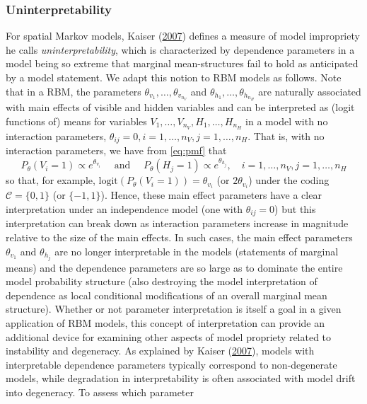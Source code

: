 \documentclass[]{article}
\theoremstyle{definition}
\newcommand{\nv}{{n_{\scriptscriptstyle V}}}
\newcommand{\nh}{{n_{\scriptscriptstyle H}}}
\begin{document}
\hypertarget{uninterpretability}{%
\subsubsection{Uninterpretability}\label{uninterpretability}}

For spatial Markov models, Kaiser
(\protect\hyperlink{ref-kaiser2007statistical}{2007}) defines a measure
of model impropriety he calls \emph{uninterpretability}, which is
characterized by dependence parameters in a model being so extreme that
marginal mean-structures fail to hold as anticipated by a model
statement. We adapt this notion to RBM models as follows. Note that in a
RBM, the parameters \(\theta_{v_1}, \dots, \theta_{v_\nv}\) and
\(\theta_{h_1}, \dots, \theta_{h_\nh}\) are naturally associated with
main effects of visible and hidden variables and can be interpreted as
(logit functions of) means for variables
\(V_1, \dots, V_\nv, H_1, \dots, H_\nh\) in a model with no interaction
parameters, \(\theta_{ij} = 0, i = 1, \dots, \nv, j = 1, \dots, \nh\).
That is, with no interaction parameters, we have from \eqref{eq:pmf} that
\[
P_\theta(V_i=1) \propto e^{\theta_{v_i}} \quad \text{ and } \quad P_\theta(H_j=1) \propto e^{\theta_{h_j}}, \quad  i=1,\ldots,\nv,j=1,\ldots,\nh
\] so that, for example, \(\text{logit}(P_\theta(V_i=1))=\theta_{v_i}\)
(or \(2 \theta_{v_i}\)) under the coding \(\mathcal{C}=\{0,1\}\) (or
\(\{-1,1\}\)). Hence, these main effect parameters have a clear
interpretation under an independence model (one with
\(\theta_{ij} = 0\)) but this interpretation can break down as
interaction parameters increase in magnitude relative to the size of the
main effects. In such cases, the main effect parameters \(\theta_{v_1}\)
and \(\theta_{h_j}\) are no longer interpretable in the models
(statements of marginal means) and the dependence parameters are so
large as to dominate the entire model probability structure (also
destroying the model interpretation of dependence as local conditional
modifications of an overall marginal mean structure). Whether or not
parameter interpretation is itself a goal in a given application of RBM
models, this concept of interpretation can provide an additional device
for examining other aspects of model propriety related to instability
and degeneracy. As explained by Kaiser
(\protect\hyperlink{ref-kaiser2007statistical}{2007}), models with
interpretable dependence parameters typically correspond to
non-degenerate models, while degradation in interpretability is often
associated with model drift into degeneracy. To assess which parameter
\end{document}
